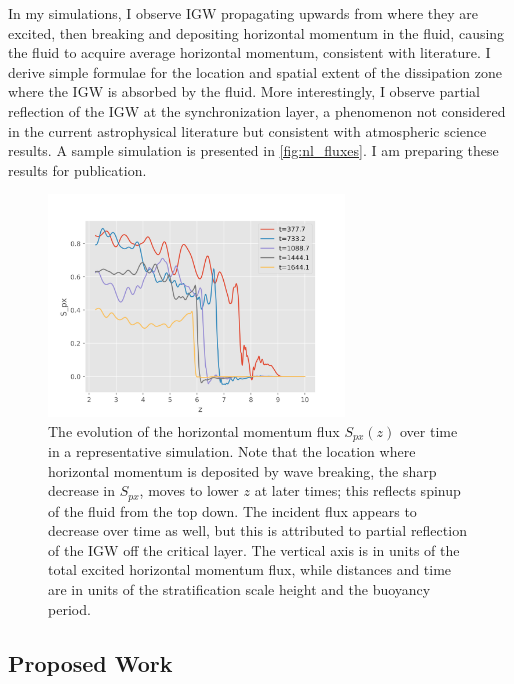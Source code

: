 \documentclass[12pt,
        usenames, %
        dvipsnames %
    ]{article}
\begin{document}
In my simulations, I observe IGW propagating upwards from where they are
excited, then breaking and depositing horizontal momentum in the fluid, causing
the fluid to acquire average horizontal momentum, consistent with
literature\cite{fullerII}. I derive simple formulae for the location and spatial
extent of the dissipation zone where the IGW is absorbed by the fluid. More
interestingly, I observe partial reflection of the IGW at the synchronization
layer\cite{me}, a phenomenon not considered in the current astrophysical
literature but consistent with atmospheric science results\cite{winters1994}. A
sample simulation is presented in \autoref{fig:nl_fluxes}. I am preparing these
results for publication\cite{me}.
\begin{figure}[!h]
    \centering
    \includegraphics[width=0.7\textwidth]{nl_fluxes.png}
    \caption{The evolution of the horizontal momentum flux $S_{px}(z)$ over time
    in a representative simulation. Note that the location where horizontal
    momentum is deposited by wave breaking, the sharp decrease in $S_{px}$,
    moves to lower $z$ at later times; this reflects spinup of the fluid from
    the top down. The incident flux appears to decrease over time as well, but
    this is attributed to partial reflection of the IGW off the critical
    layer. The vertical axis is in units of the total excited horizontal momentum
    flux, while distances and time are in units of the stratification scale
    height and the buoyancy period.}\label{fig:nl_fluxes}
\end{figure}

\subsection{Proposed Work}
\end{document}
